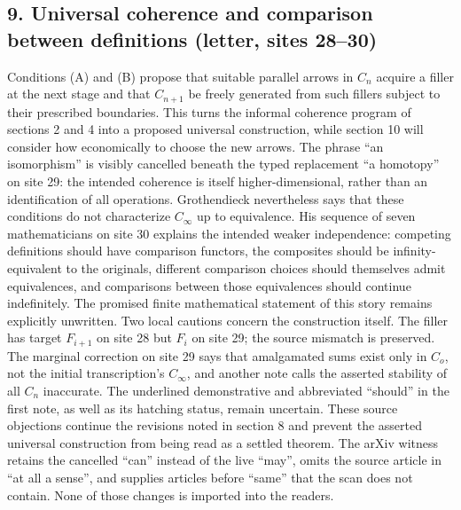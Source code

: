 \subsection*{9. Universal coherence and comparison between definitions (letter, sites 28--30)}
Conditions (A) and (B) propose that suitable parallel arrows in $C_n$ acquire a filler at the next stage and that $C_{n+1}$ be freely generated from such fillers subject to their prescribed boundaries. This turns the informal coherence program of sections 2 and 4 into a proposed universal construction, while section 10 will consider how economically to choose the new arrows. The phrase ``an isomorphism'' is visibly cancelled beneath the typed replacement ``a homotopy'' on site 29: the intended coherence is itself higher-dimensional, rather than an identification of all operations. Grothendieck nevertheless says that these conditions do not characterize $C_\infty$ up to equivalence. His sequence of seven mathematicians on site 30 explains the intended weaker independence: competing definitions should have comparison functors, the composites should be infinity-equivalent to the originals, different comparison choices should themselves admit equivalences, and comparisons between those equivalences should continue indefinitely. The promised finite mathematical statement of this story remains explicitly unwritten. Two local cautions concern the construction itself. The filler has target $F_{i+1}$ on site 28 but $F_i$ on site 29; the source mismatch is preserved. The marginal correction on site 29 says that amalgamated sums exist only in $C_o$, not the initial transcription's $C_\infty$, and another note calls the asserted stability of all $C_n$ inaccurate. The underlined demonstrative and abbreviated ``should'' in the first note, as well as its hatching status, remain uncertain. These source objections continue the revisions noted in section 8 and prevent the asserted universal construction from being read as a settled theorem. The arXiv witness retains the cancelled ``can'' instead of the live ``may'', omits the source article in ``at all a sense'', and supplies articles before ``same'' that the scan does not contain. None of those changes is imported into the readers.

